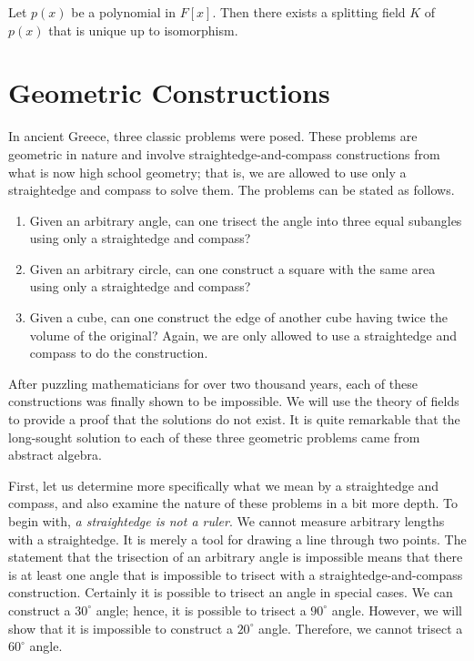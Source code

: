 \begin{corollary}\label{fields:splitting_field_corollary}
Let $p(x)$ be a polynomial in $F[x]$. Then there exists a splitting
field $K$ of $p(x)$ that is unique up to isomorphism. 
\end{corollary}


 
\section{Geometric Constructions}


In ancient Greece, three classic problems were posed. These problems
are geometric in nature and involve straightedge-and-compass
constructions from what is now high school geometry; that is, we are
allowed to use only a straightedge and compass to solve them. The
problems can be stated as follows.    
\begin{enumerate}

\item
Given an arbitrary angle, can one trisect the angle into three equal
subangles using only a straightedge and compass?

\item
Given an arbitrary circle, can one construct a square with the same
area using only a straightedge and compass?

\item
Given a cube, can one construct the edge of another cube having twice
the volume of the original? Again, we are only allowed to use a
straightedge and compass to do the construction.

\end{enumerate}
After puzzling mathematicians for over two thousand years, each of
these constructions was finally shown to be impossible.  We will use
the theory of fields to provide a proof that the solutions do not
exist.  It is quite remarkable that the long-sought solution to each
of these three geometric problems came from abstract algebra.  


First, let us determine more specifically what we mean by a
straightedge and compass, and also examine the nature of these
problems in a bit more depth.  To begin with, \emph{a straightedge is
not a ruler}. We cannot measure arbitrary lengths with a straightedge.
It is merely a tool for drawing a line through two points. The
statement that the trisection of an arbitrary angle is impossible
means that there is at least one angle that is impossible to trisect
with a straightedge-and-compass construction. Certainly it is
possible to trisect an angle in special cases.  We can construct a
$30^\circ$ angle; hence, it is possible to trisect a $90^\circ$
angle.  However, we will show that it is impossible to construct a 
$20^\circ$ angle.  Therefore, we cannot trisect a $60^\circ$ angle. 

